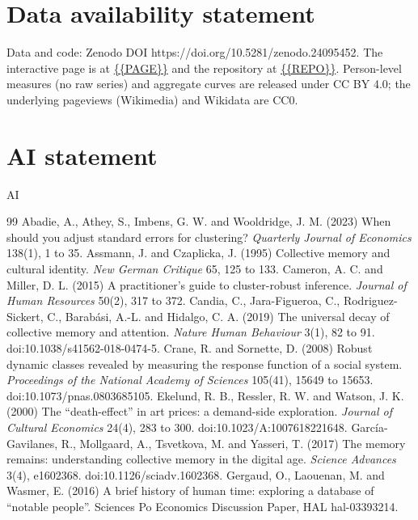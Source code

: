 \documentclass[11pt,a4paper]{article}
\begin{document}
\section*{Data availability statement}
Data and code: Zenodo DOI https://doi.org/10.5281/zenodo.24095452. The interactive page is at \url{{{PAGE}}} and the repository at \url{{{REPO}}}. Person-level measures (no raw series) and aggregate curves are released under CC BY 4.0; the underlying pageviews (Wikimedia) and Wikidata are CC0.

\section*{AI statement}
{{AI}}

\begin{thebibliography}{99}
 Abadie, A., Athey, S., Imbens, G. W. and Wooldridge, J. M. (2023) When should you adjust standard errors for clustering? \textit{Quarterly Journal of Economics} 138(1), 1 to 35.
 Assmann, J. and Czaplicka, J. (1995) Collective memory and cultural identity. \textit{New German Critique} 65, 125 to 133.
 Cameron, A. C. and Miller, D. L. (2015) A practitioner's guide to cluster-robust inference. \textit{Journal of Human Resources} 50(2), 317 to 372.
 Candia, C., Jara-Figueroa, C., Rodriguez-Sickert, C., Barabási, A.-L. and Hidalgo, C. A. (2019) The universal decay of collective memory and attention. \textit{Nature Human Behaviour} 3(1), 82 to 91. doi:10.1038/s41562-018-0474-5.
 Crane, R. and Sornette, D. (2008) Robust dynamic classes revealed by measuring the response function of a social system. \textit{Proceedings of the National Academy of Sciences} 105(41), 15649 to 15653. doi:10.1073/pnas.0803685105.
 Ekelund, R. B., Ressler, R. W. and Watson, J. K. (2000) The ``death-effect'' in art prices: a demand-side exploration. \textit{Journal of Cultural Economics} 24(4), 283 to 300. doi:10.1023/A:1007618221648.
 García-Gavilanes, R., Mollgaard, A., Tsvetkova, M. and Yasseri, T. (2017) The memory remains: understanding collective memory in the digital age. \textit{Science Advances} 3(4), e1602368. doi:10.1126/sciadv.1602368.
 Gergaud, O., Laouenan, M. and Wasmer, E. (2016) A brief history of human time: exploring a database of ``notable people''. Sciences Po Economics Discussion Paper, HAL hal-03393214.

\end{thebibliography}
\end{document}
